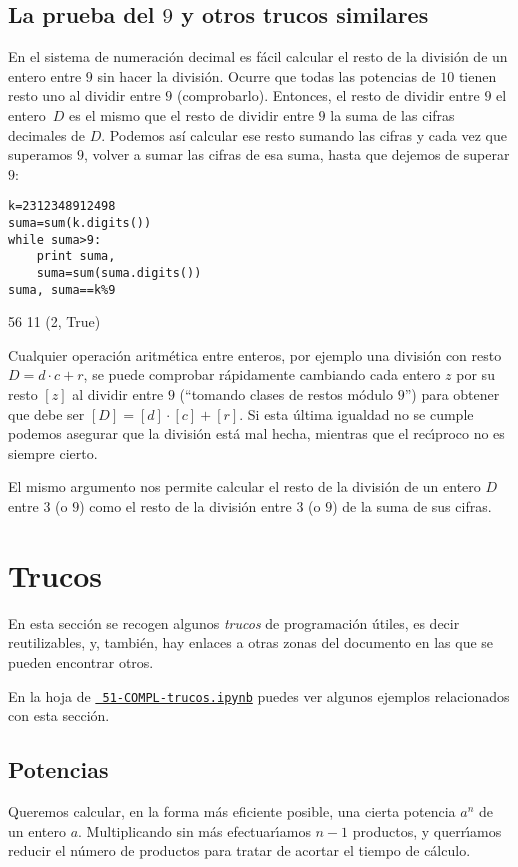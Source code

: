 \subsection{La prueba del $9$ y otros trucos similares}


En el sistema de numeraci\'on decimal es f\'acil calcular el resto de la
divisi\'on de un entero entre $9$ sin hacer la división. Ocurre que todas las
potencias de $10$
tienen resto uno al dividir entre $9$ (comprobarlo). Entonces, el resto de
dividir entre $9$ el entero~$D$ es el mismo que el resto de
dividir entre $9$ la suma de las cifras decimales de $D$. Podemos así calcular
ese
resto sumando las cifras y cada vez que superamos $9$, volver a sumar las cifras
de esa suma, hasta que dejemos de superar $9$:
\begin{lstlisting}
k=2312348912498
suma=sum(k.digits())
while suma>9:
    print suma,
    suma=sum(suma.digits())
suma, suma==k%9
\end{lstlisting}
\begin{Output}
	56 11
	(2, True)
\end{Output}

Cualquier operaci\'on aritm\'etica entre enteros, por ejemplo una divisi\'on con
resto $D=d\cdot c+r$,  se puede comprobar r\'apidamente cambiando cada entero
$z$ por su resto $[z]$  al dividir entre $9$ (``tomando clases de restos
m\'odulo $9$'') para obtener que debe ser $[D]=[d]\cdot [c]+[r].$ Si esta
\'ultima igualdad no se cumple podemos asegurar que la divisi\'on est\'a mal
hecha, mientras que el rec\'{\i}proco no es siempre cierto.


El mismo argumento nos permite calcular el resto de la divisi\'on de un entero
$D$ entre $3$ (o $9$) como el resto de la divisi\'on entre $3$ (o $9$) de la
suma de sus cifras.


\section{Trucos}

En esta secci\'on se recogen algunos {\itshape trucos} de programaci\'on
\'utiles, es decir reutilizables,  y, tambi\'en, hay  enlaces a otras zonas del
documento en las
que se pueden encontrar otros. 

En la hoja de {\sage} \href{http://localhost:8888/notebooks/PROGR/COMPL/51-COMPL-trucos.ipynb}{\tt
51-COMPL-trucos.ipynb} puedes ver algunos ejemplos relacionados con esta
secci\'on.



\subsection{Potencias} \label{potencias}
Queremos calcular, en la forma m\'as eficiente posible, una cierta  potencia
$a^n$  de un entero $a$. Multiplicando sin m\'as efec\-tua\-r\'{\i}amos $n-1$
productos, y querr\'{\i}amos reducir el n\'umero de productos para tratar de
acortar el tiempo de c\'alculo.


